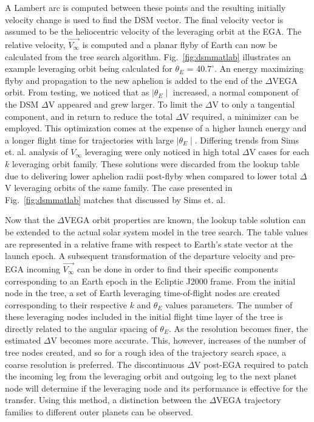 \documentclass[letterpaper, preprint, paper,11pt]{AAS}	%
\begin{document}
%
A Lambert arc is computed between these points and the resulting initially velocity change is used to find the DSM vector. The final velocity vector is assumed to be the heliocentric velocity of the leveraging orbit at the EGA. The relative velocity, $\vec{V_\infty}$ is computed and a planar flyby of Earth can now be calculated from the tree search algorithm. Fig.~\ref{fig:dsmmatlab} illustrates an example leveraging orbit being calculated for $\theta_{E}$ = 40.$7^{\circ}$. An energy maximizing flyby and propagation to the new aphelion is added to the end of the $\Delta$VEGA orbit.
%
From testing, we noticed that as $\mid\theta_E\mid$ increased, a normal component of the DSM $\Delta$V appeared and grew larger. To limit the $\Delta$V to only a tangential component, and in return to reduce the total $\Delta$V required, a minimizer can be employed. This optimization comes at the expense of a higher launch energy and a longer flight time for trajectories with large $\mid\theta_E\mid$. Differing trends from Sims et. al. analysis of $V_\infty$ leveraging\cite{sims1994} were only noticed in high total $\Delta$V cases for each $k$ leveraging orbit family. These solutions were discarded from the lookup table due to delivering lower aphelion radii post-flyby when compared to lower total $\Delta$V leveraging orbits of the same family. The case presented in Fig.~\ref{fig:dsmmatlab} matches that discussed by Sims et. al\cite{Sims1997}.

Now that the $\Delta$VEGA orbit properties are known, the lookup table solution can be extended to the actual solar system model in the tree search. The table values are represented in a relative frame with respect to Earth's state vector at the launch epoch. A subsequent transformation of the departure velocity and pre-EGA incoming $\vec{V_\infty}$ can be done in order to find their specific components corresponding to an Earth epoch in the Ecliptic J2000 frame. From the initial node in the tree, a set of Earth leveraging time-of-flight nodes are created corresponding to their respective $k$ and $\theta_E$ values parameters. The number of these leveraging nodes included in the initial flight time layer of the tree is directly related to the angular spacing of $\theta_E$. As the resolution becomes finer, the estimated $\Delta$V becomes more accurate. This, however, increases of the number of tree nodes created, and so for a rough idea of the trajectory search space, a coarse resolution is preferred. The discontinuous $\Delta$V post-EGA required to patch the incoming leg from the leveraging orbit and outgoing leg to the next planet node will determine if the leveraging node and its performance is effective for the transfer. Using this method, a distinction between the $\Delta$VEGA trajectory families to different outer planets can be observed.
\end{document}
